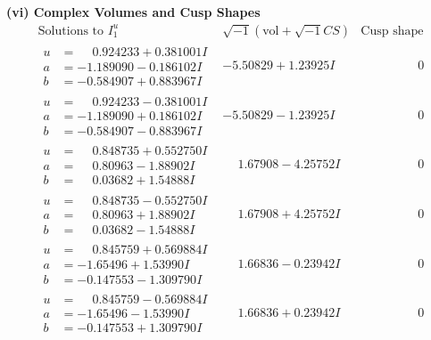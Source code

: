 \documentclass[1p]{elsarticle_modified}
\theoremstyle{definition}
\newcommand{\I}{\sqrt{-1}}
\begin{document}
\newpage\flushleft \textbf{(vi) Complex Volumes and Cusp Shapes}
$$\begin{array}{c|c|c}  
\text{Solutions to }I^u_{1}& \I (\text{vol} + \sqrt{-1}CS) & \text{Cusp shape}\\
 \hline 
\begin{aligned}
u &= \phantom{-}0.924233 + 0.381001 I \\
a &= -1.189090 - 0.186102 I \\
b &= -0.584907 + 0.883967 I\end{aligned}
 & -5.50829 + 1.23925 I & \phantom{-0.000000 } 0 \\ \hline\begin{aligned}
u &= \phantom{-}0.924233 - 0.381001 I \\
a &= -1.189090 + 0.186102 I \\
b &= -0.584907 - 0.883967 I\end{aligned}
 & -5.50829 - 1.23925 I & \phantom{-0.000000 } 0 \\ \hline\begin{aligned}
u &= \phantom{-}0.848735 + 0.552750 I \\
a &= \phantom{-}0.80963 - 1.88902 I \\
b &= \phantom{-}0.03682 + 1.54888 I\end{aligned}
 & \phantom{-}1.67908 - 4.25752 I & \phantom{-0.000000 } 0 \\ \hline\begin{aligned}
u &= \phantom{-}0.848735 - 0.552750 I \\
a &= \phantom{-}0.80963 + 1.88902 I \\
b &= \phantom{-}0.03682 - 1.54888 I\end{aligned}
 & \phantom{-}1.67908 + 4.25752 I & \phantom{-0.000000 } 0 \\ \hline\begin{aligned}
u &= \phantom{-}0.845759 + 0.569884 I \\
a &= -1.65496 + 1.53990 I \\
b &= -0.147553 - 1.309790 I\end{aligned}
 & \phantom{-}1.66836 - 0.23942 I & \phantom{-0.000000 } 0 \\ \hline\begin{aligned}
u &= \phantom{-}0.845759 - 0.569884 I \\
a &= -1.65496 - 1.53990 I \\
b &= -0.147553 + 1.309790 I\end{aligned}
 & \phantom{-}1.66836 + 0.23942 I & \phantom{-0.000000 } 0 \\ \hline\begin{aligned}

\end{aligned}
\end{array}$$
\end{document}
